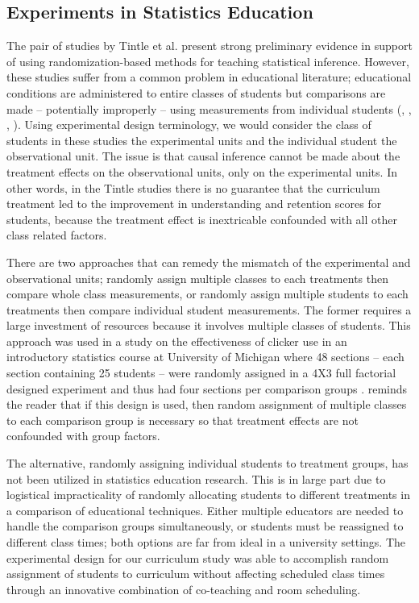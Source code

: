 \subsection{Experiments in Statistics Education} 

The pair of studies by Tintle et al. present strong preliminary evidence in support of using randomization-based methods for teaching statistical inference. However, these studies suffer from a common problem in educational literature; educational conditions are administered to entire classes of students but comparisons are made -- potentially improperly -- using measurements from individual students (\citealt{Ragasa2008}, \citealt{BaglinDaCosta2013}, \citealt{Williams2012}, \citealt{Carlson2011}). Using experimental design terminology, we would consider the class of students in these studies the experimental units and the individual student the observational unit. The issue is that causal inference cannot be made about the treatment effects on the observational units, only on the experimental units.  In other words, in the Tintle studies there is no guarantee that the curriculum treatment led to the improvement in understanding and retention scores for students, because the treatment effect is inextricable confounded with all other class related factors.

There are two approaches that can remedy the mismatch of the experimental and observational units; randomly assign multiple classes to each treatments then compare whole class measurements, or randomly assign multiple students to each treatments then compare individual student measurements. The former requires a large investment of resources because it involves multiple classes of students. This approach was used in a study on the effectiveness of clicker use in an introductory statistics course at University of Michigan where 48 sections -- each section containing 25 students -- were randomly assigned in a 4X3 full factorial designed experiment and thus had four sections per comparison groups \citep{McGowanGunderson2010}. \citet{McGowan2011} reminds the reader that if this design is used, then random assignment of multiple classes to each comparison group is necessary so that treatment effects are not confounded with group factors. 

The alternative, randomly assigning individual students to treatment groups, has not been utilized in statistics education research. This is in large part due to logistical impracticality of randomly allocating students to different treatments in a comparison of educational techniques. Either multiple educators are needed to handle the comparison groups simultaneously, or students must be reassigned to different class times; both options are far from ideal in a university settings. The experimental design for our curriculum study was able to accomplish random assignment of students to curriculum without affecting scheduled class times through an innovative combination of co-teaching and room scheduling.

